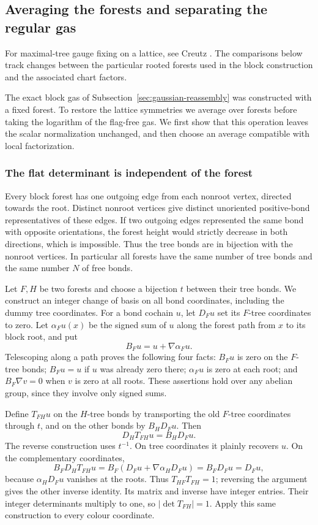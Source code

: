 \subsection{Averaging the forests and separating the regular gas}
\label{sec:forest-average-log}

For maximal-tree gauge fixing on a lattice, see Creutz
\cite{Creutz77}. The comparisons below track changes between the
particular rooted forests used in the block construction and the
associated chart factors.

The exact block gas of Subsection~\ref{sec:gaussian-reassembly} was
constructed with a fixed forest. To restore the lattice symmetries we
average over forests before taking the logarithm of the flag-free gas.
We first show that this operation leaves the scalar normalization
unchanged, and then choose an average compatible with local factorization.

\subsubsection{The flat determinant is independent of the forest}
Every block forest has one outgoing edge from each nonroot vertex,
directed towards the root. Distinct nonroot vertices give distinct
unoriented positive-bond representatives of these edges. If two
outgoing edges represented the same bond with opposite orientations,
the forest height would strictly decrease in both directions, which
is impossible. Thus the tree bonds are in bijection with the nonroot
vertices. In particular all forests have the same number of tree
bonds and the same number $N$ of free bonds.

Let $F,H$ be two forests and choose a bijection $t$ between their
tree bonds. We construct an integer change of basis on all bond
coordinates, including the dummy tree coordinates. For a bond
cochain $u$, let $D_Fu$ set its $F$-tree coordinates to zero. Let
$\alpha_Fu(x)$ be the signed sum of $u$ along the forest path from
$x$ to its block root, and put
\[
                 B_Fu=u+\nabla\alpha_Fu.
\]
Telescoping along a path proves the following four facts:
$B_Fu$ is zero on the $F$-tree bonds; $B_Fu=u$ if $u$ was already
zero there; $\alpha_Fu$ is zero at each root; and
$B_F\nabla v=0$ when $v$ is zero at all roots. These assertions hold
over any abelian group, since they involve only signed sums.

Define $T_{FH}u$ on the $H$-tree bonds by transporting the old
$F$-tree coordinates through $t$, and on the other bonds by
$B_H D_Fu$. Then
\[
                    D_HT_{FH}u=B_HD_Fu.
\]
The reverse construction uses $t^{-1}$. On tree coordinates it
plainly recovers $u$. On the complementary coordinates,
\[
 B_FD_HT_{FH}u
   =B_F(D_Fu+\nabla\alpha_HD_Fu)=B_FD_Fu=D_Fu,
\]
because $\alpha_HD_Fu$ vanishes at the roots. Thus $T_{HF}T_{FH}=1$;
reversing the argument gives the other inverse identity. Its matrix
and inverse have integer entries. Their integer determinants multiply
to one, so $|\det T_{FH}|=1$. Apply this same construction to every
colour coordinate.

